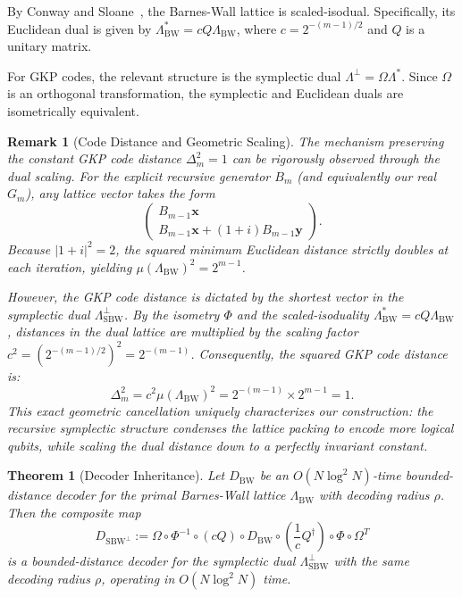 \documentclass[aps,prl,twocolumn,superscriptaddress]{revtex4-2}
\newtheorem{theorem}{Theorem}
\newtheorem{remark}{Remark}
\newcommand{\symp}{\Omega}
\newcommand{\bvec}[1]{\boldsymbol{#1}}
\begin{document}
By Conway and Sloane~\cite{conway1999}, the Barnes-Wall lattice is scaled-isodual. Specifically, its Euclidean dual is given by $\Lambda_{\mathrm{BW}}^* = c Q \Lambda_{\mathrm{BW}}$, where $c = 2^{-(m-1)/2}$ and $Q$ is a unitary matrix.

For GKP codes, the relevant structure is the symplectic dual $\Lambda^\perp = \symp \Lambda^*$. Since $\symp$ is an orthogonal transformation, the symplectic and Euclidean duals are isometrically equivalent.

\begin{remark}[Code Distance and Geometric Scaling]\label{rem:distance}
The mechanism preserving the constant GKP code distance $\Delta_m^2 = 1$ can be rigorously observed through the dual scaling. For the explicit recursive generator $B_m$ (and equivalently our real $G_m$), any lattice vector takes the form
\begin{equation}
\begin{pmatrix} B_{m-1} \bvec{x} \\ B_{m-1} \bvec{x} + (1+i)B_{m-1} \bvec{y} \end{pmatrix}.
\end{equation}
Because $|1+i|^2 = 2$, the squared minimum Euclidean distance strictly doubles at each iteration, yielding $\mu(\Lambda_{\mathrm{BW}})^2 = 2^{m-1}$.

However, the GKP code distance is dictated by the shortest vector in the symplectic dual $\Lambda_{\mathrm{SBW}}^\perp$. By the isometry $\Phi$ and the scaled-isoduality $\Lambda_{\mathrm{BW}}^* = c Q \Lambda_{\mathrm{BW}}$, distances in the dual lattice are multiplied by the scaling factor $c^2 = (2^{-(m-1)/2})^2 = 2^{-(m-1)}$. Consequently, the squared GKP code distance is:
\begin{equation}
\Delta_m^2 = c^2 \mu(\Lambda_{\mathrm{BW}})^2 = 2^{-(m-1)} \times 2^{m-1} = 1.
\end{equation}
This exact geometric cancellation uniquely characterizes our construction: the recursive symplectic structure condenses the lattice packing to encode more logical qubits, while scaling the dual distance down to a perfectly invariant constant.
\end{remark}

\begin{theorem}[Decoder Inheritance]\label{thm:decoder}
Let $D_{\mathrm{BW}}$ be an $O(N \log^2 N)$-time bounded-distance decoder for the primal Barnes-Wall lattice $\Lambda_{\mathrm{BW}}$ with decoding radius $\rho$. Then the composite map
\begin{equation}\label{eq:decoder-map}
D_{\mathrm{SBW}^\perp} := \symp \circ \Phi^{-1} \circ (c Q) \circ D_{\mathrm{BW}} \circ \left(\frac{1}{c}Q^\dagger\right) \circ \Phi \circ \symp^T
\end{equation}
is a bounded-distance decoder for the symplectic dual $\Lambda_{\mathrm{SBW}}^\perp$ with the same decoding radius $\rho$, operating in $O(N \log^2 N)$ time.
\end{theorem}
\end{document}
